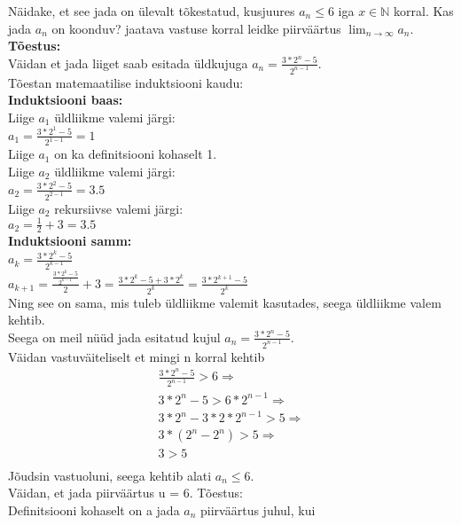 \documentclass{article}
\begin{document}
N\"aidake, et see jada on \"ulevalt t\~okestatud, kusjuures $a_n\leq 6$ iga $x\in\mathbb{N}$ korral. Kas jada $a_n$ on koonduv? jaatava vastuse korral leidke piirväärtus $\displaystyle\lim_{n\to\infty} a_n$.\\
\textbf{T\~oestus:}\\
V\"aidan et jada liiget saab esitada \"uldkujuga $a_n=\frac{3*2^{n}-5}{2^{n-1}}$.\\
T\~oestan matemaatilise induktsiooni kaudu:\\
\textbf{Induktsiooni baas:}\\
Liige $a_1$ \"uldliikme valemi j\"argi:\\
$a_1 = \frac{3*2^1-5}{2^{1-1}} = 1$\\
Liige $a_1$ on ka definitsiooni kohaselt 1.\\
Liige $a_2$ \"uldliikme valemi j\"argi:\\
$a_2 = \frac{3*2^2-5}{2^{2-1}} = 3.5$\\
Liige $a_2$ rekursiivse valemi j\"argi:\\
$a_2 = \frac{1}{2}+3 = 3.5$\\
\textbf{Induktsiooni samm:}\\
$a_k = \frac{3*2^{k}-5}{2^{k-1}}$\\
$a_{k+1} = \frac{\frac{3*2^{k}-5}{2^{k-1}}}{2}+3 = \frac{3*2^{k}-5+3*2^{k}}{2^{k}} = \frac{3*2^{k+1}-5}{2^{k}}$\\
Ning see on sama, mis tuleb \"uldliikme valemit kasutades, seega \"uldliikme valem kehtib. \\
Seega on meil n\"u\"ud jada esitatud kujul $a_n=\frac{3*2^{n}-5}{2^{n-1}}$.\\
V\"aidan vastuv\"aiteliselt et mingi n korral kehtib\\
\begin{equation*}
\begin{aligned}
\frac{3*2^{n}-5}{2^{n-1}}>6\Rightarrow\\
3*2^n-5>6*2^{n-1}\Rightarrow\\
3*2^n-3*2*2^{n-1}>5\Rightarrow\\
3*(2^n-2^n)>5\Rightarrow\\
3>5\\
\end{aligned}
\end{equation*}
J\~oudsin vastuoluni, seega kehtib alati $a_n\leq 6$.\\
V\"aidan, et jada piirv\"a\"artus u = 6. T\~oestus:\\
Definitsiooni kohaselt on a jada $a_n$ piirv\"a\"artus juhul, kui
\end{document}
